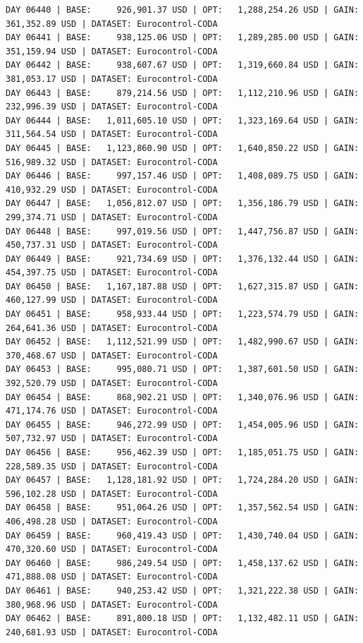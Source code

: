 \documentclass[11pt,a4paper]{article}
\begin{document}
\begin{verbatim}
DAY 06440 | BASE:     926,901.37 USD | OPT:   1,288,254.26 USD | GAIN: 361,352.89 USD | DATASET: Eurocontrol-CODA
DAY 06441 | BASE:     938,125.06 USD | OPT:   1,289,285.00 USD | GAIN: 351,159.94 USD | DATASET: Eurocontrol-CODA
DAY 06442 | BASE:     938,607.67 USD | OPT:   1,319,660.84 USD | GAIN: 381,053.17 USD | DATASET: Eurocontrol-CODA
DAY 06443 | BASE:     879,214.56 USD | OPT:   1,112,210.96 USD | GAIN: 232,996.39 USD | DATASET: Eurocontrol-CODA
DAY 06444 | BASE:   1,011,605.10 USD | OPT:   1,323,169.64 USD | GAIN: 311,564.54 USD | DATASET: Eurocontrol-CODA
DAY 06445 | BASE:   1,123,860.90 USD | OPT:   1,640,850.22 USD | GAIN: 516,989.32 USD | DATASET: Eurocontrol-CODA
DAY 06446 | BASE:     997,157.46 USD | OPT:   1,408,089.75 USD | GAIN: 410,932.29 USD | DATASET: Eurocontrol-CODA
DAY 06447 | BASE:   1,056,812.07 USD | OPT:   1,356,186.79 USD | GAIN: 299,374.71 USD | DATASET: Eurocontrol-CODA
DAY 06448 | BASE:     997,019.56 USD | OPT:   1,447,756.87 USD | GAIN: 450,737.31 USD | DATASET: Eurocontrol-CODA
DAY 06449 | BASE:     921,734.69 USD | OPT:   1,376,132.44 USD | GAIN: 454,397.75 USD | DATASET: Eurocontrol-CODA
DAY 06450 | BASE:   1,167,187.88 USD | OPT:   1,627,315.87 USD | GAIN: 460,127.99 USD | DATASET: Eurocontrol-CODA
DAY 06451 | BASE:     958,933.44 USD | OPT:   1,223,574.79 USD | GAIN: 264,641.36 USD | DATASET: Eurocontrol-CODA
DAY 06452 | BASE:   1,112,521.99 USD | OPT:   1,482,990.67 USD | GAIN: 370,468.67 USD | DATASET: Eurocontrol-CODA
DAY 06453 | BASE:     995,080.71 USD | OPT:   1,387,601.50 USD | GAIN: 392,520.79 USD | DATASET: Eurocontrol-CODA
DAY 06454 | BASE:     868,902.21 USD | OPT:   1,340,076.96 USD | GAIN: 471,174.76 USD | DATASET: Eurocontrol-CODA
DAY 06455 | BASE:     946,272.99 USD | OPT:   1,454,005.96 USD | GAIN: 507,732.97 USD | DATASET: Eurocontrol-CODA
DAY 06456 | BASE:     956,462.39 USD | OPT:   1,185,051.75 USD | GAIN: 228,589.35 USD | DATASET: Eurocontrol-CODA
DAY 06457 | BASE:   1,128,181.92 USD | OPT:   1,724,284.20 USD | GAIN: 596,102.28 USD | DATASET: Eurocontrol-CODA
DAY 06458 | BASE:     951,064.26 USD | OPT:   1,357,562.54 USD | GAIN: 406,498.28 USD | DATASET: Eurocontrol-CODA
DAY 06459 | BASE:     960,419.43 USD | OPT:   1,430,740.04 USD | GAIN: 470,320.60 USD | DATASET: Eurocontrol-CODA
DAY 06460 | BASE:     986,249.54 USD | OPT:   1,458,137.62 USD | GAIN: 471,888.08 USD | DATASET: Eurocontrol-CODA
DAY 06461 | BASE:     940,253.42 USD | OPT:   1,321,222.38 USD | GAIN: 380,968.96 USD | DATASET: Eurocontrol-CODA
DAY 06462 | BASE:     891,800.18 USD | OPT:   1,132,482.11 USD | GAIN: 240,681.93 USD | DATASET: Eurocontrol-CODA

\end{verbatim}
\end{document}
